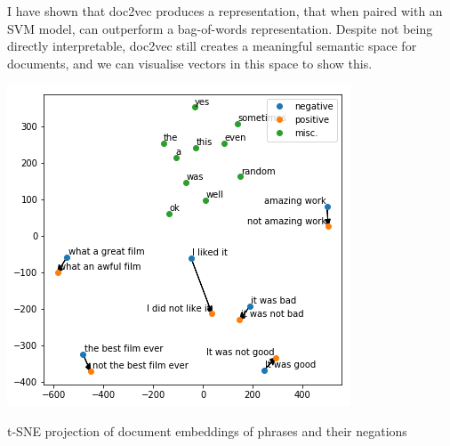\documentclass[a4paper]{article}
\makeatletter
\newenvironment{figurehere}
    {\def\@captype{figure}}
    {}
\makeatother
\begin{document}
\begin{multicols}{2}
I have shown that doc2vec produces a representation, that when paired with an SVM model, can outperform a bag-of-words representation. Despite not being directly interpretable, doc2vec still creates a meaningful semantic space for documents, and we can visualise vectors in this space to show this.

\begin{figurehere}
  \centering
  \includegraphics[width=\linewidth,height=\textheight,keepaspectratio]{figs/tsne-docs.png}
  \caption{t-SNE projection of document embeddings of phrases and their negations}
  \label{fig:tsne-docs}
\end{figurehere}
\end{multicols}
\clearpage

\end{document}
